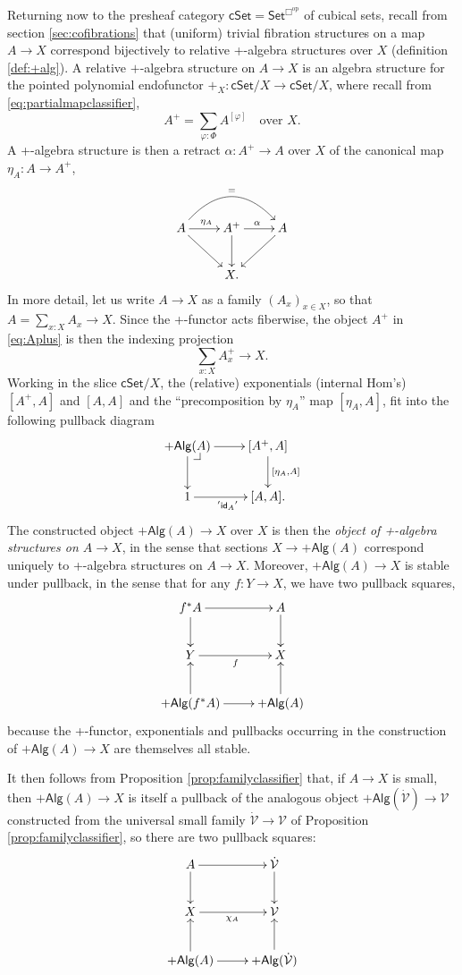 \documentclass[11pt,reqno]{amsart}
\makeatletter
\newcommand{\psh}[1]{\ensuremath{\mathsf{Set}^{#1^{\mathrm{op}}}}}
\newcommand{\cSet}{\ensuremath{\mathsf{cSet}}}
\newcommand{\ra}{\ensuremath{\rightarrow}}
\newcommand{\too}{\ensuremath{\longrightarrow}}
\newcommand{\V}{\ensuremath{\mathcal{V}}}
\newcommand{\VV}{\ensuremath{\dot{\mathcal{V}}}}
\theoremstyle{remark}
\theoremstyle{definition}
\newcommand{\pbcorner}[1][dr]{\save*!/#1-1.2pc/#1:(-1,1)@^{|-}\restore}
\makeatother
\begin{document}
Returning now to the presheaf category $\cSet = \psh{\Box}$ of cubical sets, recall from section \ref{sec:cofibrations} that (uniform) trivial fibration structures on a map $A\ra X$ correspond bijectively to relative +-algebra structures over $X$ (definition \ref{def:+alg}).  A relative $+$-algebra structure on $A \ra X$ is an algebra structure for the pointed polynomial endofunctor $+_X : \cSet/X \too \cSet/X$, where recall from \eqref{eq:partialmapclassifier}, 
\[
A^+ = \sum_{\varphi: \Phi} A^{[\varphi]}\quad\text{over $X$}.
\]
A +-algebra structure is then a retract $\alpha : A^+\ra A$ over $X$ of the canonical map $\eta_A : A\ra A^+$,
\begin{equation}\label{eq:Aplus}
\xymatrix{
A\ar[rd] \ar[r]^{\eta_A} \ar@/^6ex/ [rr]^= & A^+ \ar[r]^{\alpha} \ar[d]& \ar[ld]A \\
& X. &
}
\end{equation}
In more detail, let us write $A\ra X$ as a family $(A_x)_{x\in X}$, so that $A=\sum_{x:X}A_x \ra X$. Since the +-functor acts fiberwise, the object $A^+$ in \eqref{eq:Aplus} is then the indexing projection
\[
\sum_{x:X}A^+_x \ra X.
\]
Working in the slice  $\cSet/X$, the (relative) exponentials (internal Hom's) $[A^+, A]$ and $[A, A]$ and the ``precomposition by $\eta_A$'' map $[\eta_A, A]$,  fit into the following pullback diagram 
\begin{equation}\label{diag:plualgstru}
\xymatrix{
+\mathsf{Alg}(A)\ar[d] \ar[r] \pbcorner & [A^+, A] \ar[d]^{[\eta_A, A]}\\
1 \ar[r]_{'{\mathsf{id}_A}'} & [A, A].
}
\end{equation}
The constructed object $+\mathsf{Alg}(A) \ra X$ over $X$ is then the \emph{object of +-algebra structures on $A\ra X$}, in the sense that sections $X \ra +\mathsf{Alg}(A)$ correspond uniquely to +-algebra structures on $A\ra X$. Moreover, $+\mathsf{Alg}(A) \ra X$ is stable under pullback, in the sense that for any $f:Y\ra X$, we have two pullback squares,
\begin{equation}\label{diagram:pbplus}
\xymatrix{
f^*A \ar[d] \ar[r]  & A \ar[d]\\
Y \ar[r]_{f} &X\\
+\mathsf{Alg}(f^*A)\ar[u] \ar[r] & +\mathsf{Alg}(A)\ar[u].
}
\end{equation}
because the +-functor, exponentials and pullbacks occurring in the construction of $+\mathsf{Alg}(A) \ra X$ are themselves all stable. 

It then follows from Proposition \ref{prop:familyclassifier} that, if $A\ra X$ is small, then $+\mathsf{Alg}(A) \ra X$ is itself a pullback of the analogous object $+\mathsf{Alg}(\VV) \ra \V$ constructed from the universal small family $\VV\ra\V$ of Proposition \ref{prop:familyclassifier}, so there are two pullback squares:
\begin{equation}\label{diagram:tfib1}
\xymatrix{
A \ar[d] \ar[r]  & \VV \ar[d]\\
X \ar[r]_{\chi_A} & \V\\
+\mathsf{Alg}(A)\ar[u] \ar[r] & +\mathsf{Alg}(\VV)\ar[u].
}
\end{equation}
\end{document}

